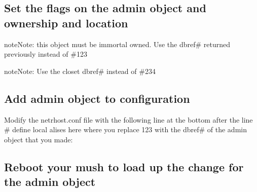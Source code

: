 \documentclass[letterpaper,10pt,english]{sphinxmanual}
\begin{document}
\subsection{Set the flags on the admin object and ownership and location}
\label{\detokenize{gettingstarted:set-the-flags-on-the-admin-object-and-ownership-and-location}}
\begin{sphinxadmonition}{note}{Note:}
\sphinxAtStartPar
this object must be immortal owned.  Use the dbref\# returned previously instead of \#123
\end{sphinxadmonition}

\begin{sphinxadmonition}{note}{Note:}
\sphinxAtStartPar
Use the closet dbref\# instead of \#234
\end{sphinxadmonition}

\begin{sphinxVerbatim}[commandchars=\\\{\}]
   
 
 
\end{sphinxVerbatim}


\subsection{Add admin object to configuration}
\label{\detokenize{gettingstarted:add-admin-object-to-configuration}}
\sphinxAtStartPar
Modify the netrhost.conf file with the following line at the bottom after the line \textquotesingle{}\# define local alises here\textquotesingle{} where you replace 123 with the dbref\# of the admin object that you made:

\begin{sphinxVerbatim}[commandchars=\\\{\}]
 
\end{sphinxVerbatim}


\subsection{Reboot your mush to load up the change for the admin object}
\label{\detokenize{gettingstarted:reboot-your-mush-to-load-up-the-change-for-the-admin-object}}
\begin{sphinxVerbatim}[commandchars=\\\{\}]
\end{sphinxVerbatim}
\end{document}
